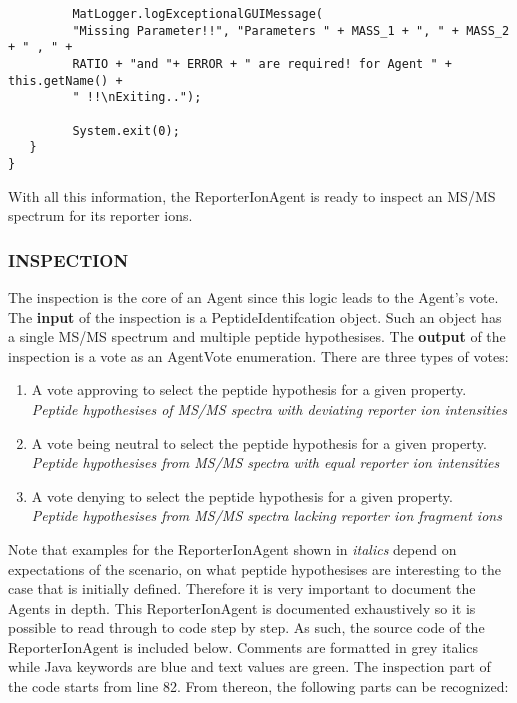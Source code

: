 {\begin{algorithm}[H]
\begin{verbatim}
         MatLogger.logExceptionalGUIMessage(
         "Missing Parameter!!", "Parameters " + MASS_1 + ", " + MASS_2 + " , " +
         RATIO + "and "+ ERROR + " are required! for Agent " + this.getName() +
         " !!\nExiting..");
         
         System.exit(0);
   }
}
\end{verbatim}
\end{algorithm}
\npar With all this information, the ReporterIonAgent is ready to inspect an MS/MS spectrum for its reporter ions.
\subsubsection{INSPECTION}
\npar The inspection is the core of an Agent since this logic leads to the Agent's vote. The \textbf{input }of the inspection is a PeptideIdentifcation object. Such an object has a single MS/MS spectrum and multiple peptide hypothesises. The \textbf{output} of the inspection is a vote as an AgentVote enumeration. There are three types of votes:
\begin{enumerate}
\item A vote approving to select the peptide hypothesis for a given property.\\\textit{Peptide hypothesises of MS/MS spectra with deviating reporter ion intensities}
\item A vote being neutral to select the peptide hypothesis for a given property.\\\textit{Peptide hypothesises from MS/MS spectra with equal reporter ion intensities}
\item A vote denying to select the peptide hypothesis for a given property.\\\textit{Peptide hypothesises from MS/MS spectra lacking reporter ion fragment ions}
\end{enumerate}
\npar Note that examples for the ReporterIonAgent shown in \textit{italics} depend on expectations of the scenario, on what peptide hypothesises are interesting to the case that is initially defined. Therefore it is very important to document the Agents in depth.
%
\npar This ReporterIonAgent is documented exhaustively so it is possible to read through to code step by step. As such, the source code of the ReporterIonAgent is included below. Comments are formatted in grey italics while Java keywords are blue and text values are green. The inspection part of the code starts from line 82. From thereon, the following parts can be recognized: 
\begin{description}

\end{description}}
